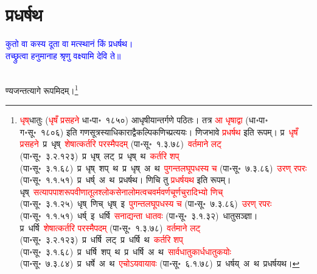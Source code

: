 \section[प्रधर्षथ]{प्रधर्षथ}
\centering\textcolor{blue}{कुतो वा कस्य दूता वा मत्स्थानं किं प्रधर्षथ।\nopagebreak\\
तच्छ्रुत्वा हनुमानाह श्रृणु वक्ष्यामि देवि ते॥}\nopagebreak\\
\\
\fontsize{14}{21}\selectfont\begin{sloppypar}\justifying\noindent\hspace{10mm} ण्यजन्तत्यागे रूपमिदम्।\footnote{\textcolor{red}{धृष्‌}\-धातुः (\textcolor{red}{धृषँ प्रसहने} धा॰पा॰~१८५०) आधृषीयान्तर्गणे पठितः। तत्र \textcolor{red}{आ धृषाद्वा} (धा॰पा॰ ग॰सू॰~१८०६) इति गणसूत्रस्याधिकाराद्वैकल्पिक\-णिच्प्रत्ययः। णिजभावे \textcolor{red}{प्रधर्षथ} इति रूपम्। प्र~\textcolor{red}{धृषँ प्रसहने}~\arrow प्र~धृष्~\arrow \textcolor{red}{शेषात्कर्तरि परस्मैपदम्} (पा॰सू॰~१.३.७८)~\arrow \textcolor{red}{वर्तमाने लट्} (पा॰सू॰~३.२.१२३)~\arrow प्र~धृष्~लट्~\arrow प्र~धृष्~थ~\arrow \textcolor{red}{कर्तरि शप्‌} (पा॰सू॰~३.१.६८)~\arrow प्र~धृष्~शप्~थ~\arrow प्र~धृष्~अ~थ~\arrow \textcolor{red}{पुगन्त\-लघूपधस्य च} (पा॰सू॰~७.३.८६)~\arrow \textcolor{red}{उरण् रपरः} (पा॰सू॰~१.१.५१)~\arrow प्र~धर्ष्~अ~थ~\arrow प्रधर्षथ। णिचि तु \textcolor{red}{प्रधर्षयथ} इति रूपम्। धृष्~\arrow \textcolor{red}{सत्याप\-पाश\-रूप\-वीणा\-तूल\-श्लोक\-सेना\-लोम\-त्वच\-वर्म\-वर्ण\-चूर्ण\-चुरादिभ्यो णिच्} (पा॰सू॰~३.१.२५)~\arrow धृष्~णिच्~\arrow धृष्~इ~\arrow \textcolor{red}{पुगन्त\-लघूपधस्य च} (पा॰सू॰~७.३.८६)~\arrow \textcolor{red}{उरण् रपरः} (पा॰सू॰~१.१.५१)~\arrow धर्ष्~इ~\arrow धर्षि~\arrow \textcolor{red}{सनाद्यन्ता धातवः} (पा॰सू॰~३.१.३२)~\arrow धातु\-सञ्ज्ञा। प्र~धर्षि~\arrow \textcolor{red}{शेषात्कर्तरि परस्मैपदम्} (पा॰सू॰~१.३.७८)~\arrow \textcolor{red}{वर्तमाने लट्} (पा॰सू॰~३.२.१२३)~\arrow प्र~धर्षि~लट्~\arrow प्र~धर्षि~थ~\arrow \textcolor{red}{कर्तरि शप्‌} (पा॰सू॰~३.१.६८)~\arrow प्र~धर्षि~शप्~थ~\arrow प्र~धर्षि~अ~थ~\arrow \textcolor{red}{सार्वधातुकार्धधातुकयोः} (पा॰सू॰~७.३.८४)~\arrow प्र~धर्षे~अ~थ~\arrow \textcolor{red}{एचोऽयवायावः} (पा॰सू॰~६.१.७८)~\arrow प्र~धर्षय्~अ~थ~\arrow प्रधर्षयथ।}\end{sloppypar}
